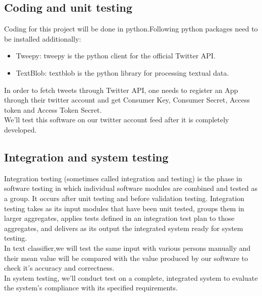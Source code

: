 \subsection{Coding and unit testing}
Coding for this project will be done in python.Following python packages need to be installed additionally:
\begin{itemize}
\item Tweepy: tweepy is the python client for the official Twitter API.
\item TextBlob: textblob is the python library for processing textual data.
\end{itemize}
In order to fetch tweets through Twitter API, one needs to register an App through their twitter account and get Consumer Key, Consumer Secret, Access token and Access Token Secret.\\
We'll test this software on our twitter account feed after it is completely developed.
\subsection{Integration and system testing}
Integration testing (sometimes called integration and testing) is the phase in software testing in which individual software modules are combined and tested as a group. It occurs after unit testing and before validation testing. Integration testing takes as its input modules that have been unit tested, groups them in larger aggregates, applies tests defined in an integration test plan to those aggregates, and delivers as its output the integrated system ready for system testing.\\
In text classifier,we will test the same input with various persons manually and their mean value will be compared with the value produced by our software to check it's accuracy and correctness.\\ 
In system testing, we'll conduct test on a complete, integrated system to evaluate the system's compliance with its specified requirements.
